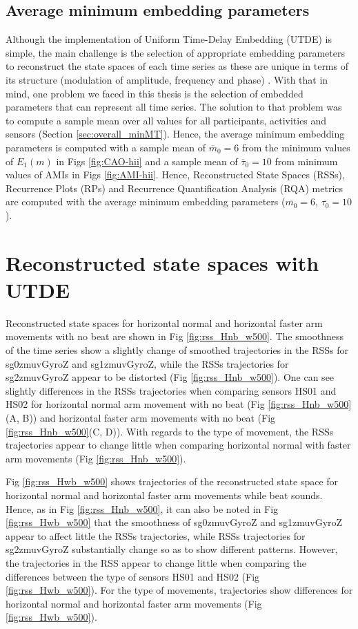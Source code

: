 \newpage
\subsection{Average minimum embedding parameters}
Although the implementation of Uniform Time-Delay Embedding (UTDE) 
is simple, the main challenge is the selection of appropriate embedding 
parameters to reconstruct the state spaces of each time series
as these are unique in terms of its structure (modulation of amplitude, 
frequency and phase) \citep{ frank2010, sama2013, bradley2015}.
With that in mind, one problem we faced in this thesis is the
selection of embedded parameters that can represent all time series. 
The solution to that problem was to compute a sample mean over 
all values for all participants, activities and sensors
(Section \ref{sec:overall_minMT}).
Hence, the average minimum embedding parameters is computed with 
a sample mean of $\overline{m}_0=6$ from the minimum values 
of $E_{1}(m)$ in Figs \ref{fig:CAO-hii} and a sample mean 
of $\overline{\tau}_0=10$ from minimum values of AMIs in Figs \ref{fig:AMI-hii}.
Hence, Reconstructed State Spaces (RSSs), Recurrence Plots (RPs) and
Recurrence Quantification Analysis (RQA) metrics
are computed with the average minimum embedding parameters 
($\overline{m_0}=6$, $\overline{\tau_0}=10$).

\section{Reconstructed state spaces with UTDE}
Reconstructed state spaces for horizontal normal and horizontal faster 
arm movements with no beat are shown in Fig \ref{fig:rss_Hnb_w500}.
The smoothness of the time series show a slightly change of smoothed 
trajectories in the RSSs for sg0zmuvGyroZ and sg1zmuvGyroZ, while the 
RSSs trajectories for sg2zmuvGyroZ appear to be distorted 
(Fig \ref{fig:rss_Hnb_w500}).
One can see slightly differences in the RSSs trajectories when comparing 
sensors HS01 and HS02 for horizontal normal arm movement with no beat 
(Fig \ref{fig:rss_Hnb_w500}(A, B)) and horizontal faster arm movements 
with no beat (Fig \ref{fig:rss_Hnb_w500}(C, D)).
With regards to the type of movement, the RSSs trajectories appear 
to change little when comparing horizontal normal with faster arm movements 
(Fig \ref{fig:rss_Hnb_w500}).

Fig \ref{fig:rss_Hwb_w500} shows trajectories of the reconstructed 
state space for horizontal normal and horizontal faster arm movements 
while beat sounds. Hence, as in Fig \ref{fig:rss_Hnb_w500}, 
it can also be noted in Fig \ref{fig:rss_Hwb_w500} that the smoothness 
of sg0zmuvGyroZ and sg1zmuvGyroZ appear to affect little the RSSs 
trajectories, while RSSs trajectories for sg2zmuvGyroZ substantially change 
so as to show different patterns. However, the trajectories in the RSS 
appear to change little when comparing the differences between the type 
of sensors HS01 and HS02 (Fig \ref{fig:rss_Hwb_w500}).
For the type of movements, trajectories show differences for horizontal
normal and horizontal faster arm movements (Fig \ref{fig:rss_Hwb_w500}).

